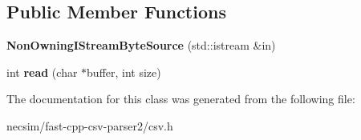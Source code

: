 \subsection*{Public Member Functions}
\begin{DoxyCompactItemize}
\item 
{\bfseries Non\+Owning\+I\+Stream\+Byte\+Source} (std\+::istream \&in)\hypertarget{classio_1_1detail_1_1_non_owning_i_stream_byte_source_aacb55ba2f52ba1c30810697d6aa92169}{}\label{classio_1_1detail_1_1_non_owning_i_stream_byte_source_aacb55ba2f52ba1c30810697d6aa92169}

\item 
int {\bfseries read} (char $\ast$buffer, int size)\hypertarget{classio_1_1detail_1_1_non_owning_i_stream_byte_source_ac7b1968c8314896d7ec0ebb97fdda30d}{}\label{classio_1_1detail_1_1_non_owning_i_stream_byte_source_ac7b1968c8314896d7ec0ebb97fdda30d}

\end{DoxyCompactItemize}


The documentation for this class was generated from the following file\+:\begin{DoxyCompactItemize}
\item 
necsim/fast-\/cpp-\/csv-\/parser2/csv.\+h\end{DoxyCompactItemize}
